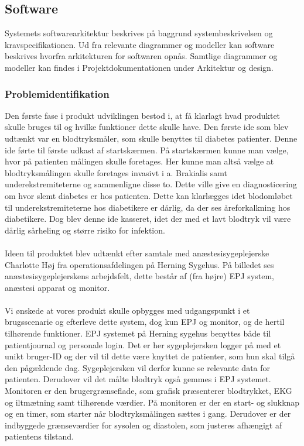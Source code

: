 \subsection{Software}
Systemets softwarearkitektur beskrives på baggrund systembeskrivelsen og kravspecifikationen. Ud fra relevante diagrammer og modeller kan software beskrives hvorfra arkitekturen for softwaren opnås. Samtlige diagrammer og modeller kan findes i Projektdokumentationen under Arkitektur og design.
\subsubsection{Problemidentifikation}
Den første fase i produkt udviklingen bestod i, at få klarlagt hvad produktet skulle bruges til og hvilke funktioner dette skulle have. Den første ide som blev udtænkt var en blodtryksmåler, som skulle benyttes til diabetes patienter. Denne ide førte til første udkast af startskærmen. På startskærmen kunne man vælge, hvor på patienten målingen skulle foretages. Her kunne man altså vælge at blodtryksmålingen skulle foretages invasivt i a. Brakialis samt underekstremiteterne og sammenligne disse to. Dette ville give en diagnosticering om hvor slemt diabetes er hos patienten. Dette kan klarlægges idet blodomløbet til underekstremiteterne hos diabetikere er dårlig, da der ses åreforkalkning hos diabetikere. Dog blev denne ide kasseret, idet der med et lavt blodtryk vil være dårlig sårheling og større risiko for infektion.\\\\
Ideen til produktet blev udtænkt efter samtale med anæstesisygeplejerske Charlotte Høj fra operationsafdelingen på Herning Sygehus. På billedet ses anæstesisygeplejerskens arbejdsfelt, dette består af (fra højre) EPJ system, anæstesi apparat og monitor.\\\\
Vi ønskede at vores produkt skulle opbygges med udgangspunkt i et brugsscenarie og efterleve dette system, dog kun EPJ og monitor, og de hertil tilhørende funktioner. EPJ systemet på Herning sygehus benyttes både til patientjournal og personale login. Det er her sygeplejersken logger på med et unikt bruger-ID og der vil til dette være knyttet de patienter, som hun skal tilgå den pågældende dag. Sygeplejersken vil derfor kunne se relevante data for patienten. Derudover vil det målte blodtryk også gemmes i EPJ systemet. Monitoren er den brugergrænseflade, som grafisk præsenterer blodtrykket, EKG og iltmætning samt tilhørende værdier. På monitoren er der en start- og slukknap og en timer, som starter når blodtryksmålingen sættes i gang. Derudover er der indbyggede grænseværdier for sysolen og diastolen, som justeres afhængigt af patientens tilstand. 
